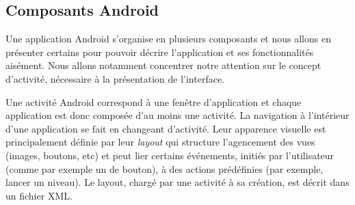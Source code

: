 \documentclass[../main.tex]{subfiles}
\begin{document}
	\subsection{Composants Android}
	Une application Android s'organise en plusieurs composants et nous allons en présenter certains pour pouvoir décrire l'application et ses fonctionnalités aisément. Nous allons notamment concentrer notre attention sur le concept d'activité, nécessaire à la présentation de l'interface.
	
	Une activité Android correspond à une fenêtre d'application et chaque application est donc composée d'au moins une activité. La navigation à l'intérieur d'une application se fait en changeant d'activité. Leur apparence visuelle est principalement définie par leur \textit{layout} qui structure l'agencement des vues (images, boutons, etc) et peut lier certains événements, initiés par l'utilisateur (comme par exemple un  de bouton), à des actions prédéfinies (par exemple, lancer un niveau). Le layout, chargé par une activité à sa création, est décrit dans un fichier XML.
	
\end{document}
